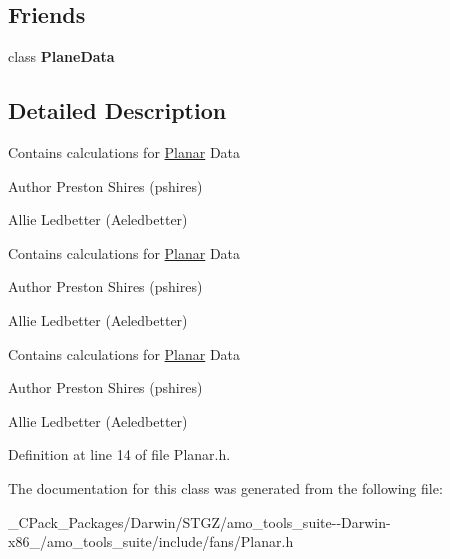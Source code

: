 \subsection*{Friends}
\begin{DoxyCompactItemize}
\item 
\mbox{\label{class_velocity_pressure_traverse_data_a31f6bbdce0894df6a817f493afffda84}} 
class {\bfseries Plane\+Data}
\end{DoxyCompactItemize}


\subsection{Detailed Description}
Contains calculations for \hyperlink{class_planar}{Planar} Data \begin{DoxyAuthor}{Author}
Preston Shires (pshires) 

Allie Ledbetter (Aeledbetter) 
\end{DoxyAuthor}


Contains calculations for \hyperlink{class_planar}{Planar} Data \begin{DoxyAuthor}{Author}
Preston Shires (pshires) 

Allie Ledbetter (Aeledbetter) 
\end{DoxyAuthor}


Contains calculations for \hyperlink{class_planar}{Planar} Data \begin{DoxyAuthor}{Author}
Preston Shires (pshires) 

Allie Ledbetter (Aeledbetter) 
\end{DoxyAuthor}


Definition at line 14 of file Planar.\+h.



The documentation for this class was generated from the following file\+:\begin{DoxyCompactItemize}
\item 
\+\_\+\+C\+Pack\+\_\+\+Packages/\+Darwin/\+S\+T\+G\+Z/amo\+\_\+tools\+\_\+suite-\/-\/\+Darwin-\/x86\+\_/amo\+\_\+tools\+\_\+suite/include/fans/Planar.\+h\end{DoxyCompactItemize}
